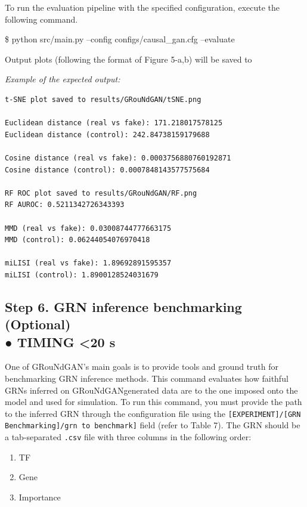 \begin{tcolorbox}
To run the evaluation pipeline with the specified configuration, execute the following command.
\begin{codeblock}
\$ python src/main.py --config configs/causal\_gan.cfg --evaluate 
\end{codeblock}

Output plots (following the format of Figure 5-a,b) will be saved to 

\textit{Example of the expected output:}
\begin{codeblock}
\begin{verbatim}
t-SNE plot saved to results/GRouNdGAN/tSNE.png

Euclidean distance (real vs fake): 171.218017578125
Euclidean distance (control): 242.84738159179688

Cosine distance (real vs fake): 0.0003756880760192871
Cosine distance (control): 0.0007848143577575684

RF ROC plot saved to results/GRouNdGAN/RF.png
RF AUROC: 0.5211342726343393

MMD (real vs fake): 0.03008744777663175
MMD (control): 0.06244054076970418

miLISI (real vs fake): 1.89692891595357
miLISI (control): 1.8900128524031679
\end{verbatim}
\end{codeblock}

\subsection*{Step 6. GRN inference benchmarking (Optional)\\● TIMING <20 s}

One of GRouNdGAN’s main goals is to provide tools and ground truth for benchmarking GRN
inference methods. This command evaluates how faithful GRNs inferred on GRouNdGANgenerated data are to the one imposed onto the model and used for simulation. To run this
command, you must provide the path to the inferred GRN through the configuration file using
the \texttt{[EXPERIMENT]/[GRN Benchmarking]/grn to benchmark]} field (refer to Table 7).
The GRN should be a tab-separated \texttt{.csv} file with three columns in the following order:

\begin{enumerate}
	\item TF
	\item Gene 
	\item Importance
\end{enumerate}


\end{tcolorbox}

